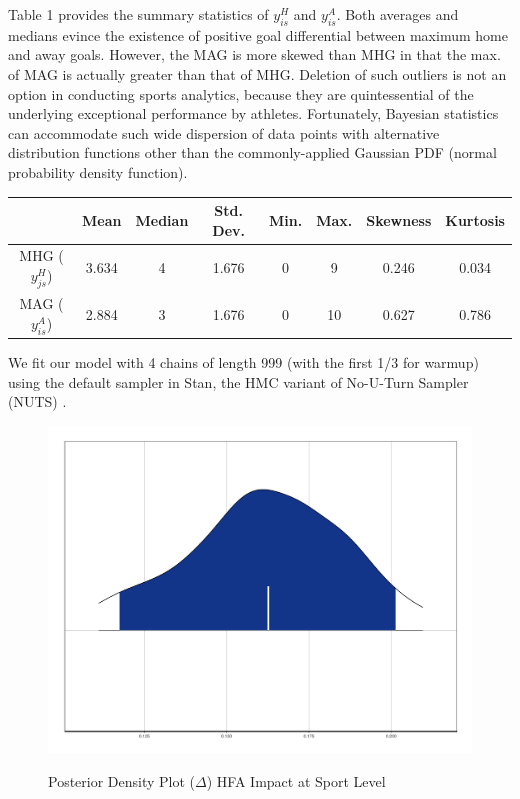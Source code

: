 \documentclass[]{interact}
\theoremstyle{plain}%
\theoremstyle{definition}
\theoremstyle{remark}
\begin{document}
Table 1 provides the summary statistics of $y^H_{is}$ and $y^A_{is}$. Both averages and medians evince the existence of positive goal differential between maximum home and away goals. However, the MAG is more skewed than MHG in that the max. of MAG is actually greater than that of MHG. Deletion of such outliers is not an option in conducting sports analytics, because they are quintessential of the underlying exceptional performance by athletes. Fortunately, Bayesian statistics can accommodate such wide dispersion of data points with alternative distribution functions other than the commonly-applied Gaussian PDF (normal probability density function). 

\begin{table}[h]
	{\begin{tabular}{cccccccc}\toprule
		
		& Mean & Median & Std. Dev. & Min. & Max. & Skewness & Kurtosis\\ \midrule
		MHG ($y^H_{js}$) & 3.634 & 4 & 1.676 & 0 & 9 & 0.246 & 0.034 \\
		
		MAG ($y^A_{is}$) & 2.884 & 3 & 1.676 & 0 & 10 & 0.627 & 0.786 \\ \bottomrule
		
	\end{tabular}}
	\label{tab1}
\end{table}

We fit our model with 4 chains of length 999 (with the first 1/3 for warmup) using the default sampler in Stan, the HMC variant of No-U-Turn Sampler (NUTS) \citep{Hoffman2014}.  


\begin{figure}
	{\includegraphics[width=0.9\linewidth]{HFA_Posterior_Sport.pdf}}
	\caption{Posterior Density Plot ($\Delta$) HFA Impact at Sport Level}	
	\label{fig1}
\end{figure}
\end{document}
